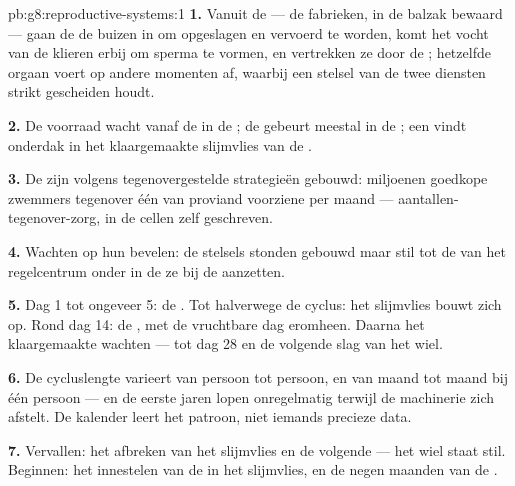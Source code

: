 \begin{solution}{pb:g8:reproductive-systems:1}
\textbf{1.} Vanuit de  --- de fabrieken, in de balzak bewaard ---
gaan de  de buizen in om opgeslagen en vervoerd te worden, komt
het vocht van de klieren erbij om sperma te vormen, en vertrekken ze door
de ; hetzelfde orgaan voert op andere momenten  af, waarbij een
stelsel van  de twee diensten strikt gescheiden houdt.

\textbf{2.} De voorraad wacht vanaf de  in de ; de
 gebeurt meestal in de ; een  vindt
onderdak in het klaargemaakte slijmvlies van de .

\textbf{3.} De  zijn volgens tegenovergestelde strategieën
gebouwd: miljoenen goedkope zwemmers tegenover één van proviand voorziene
 per maand --- aantallen-tegenover-zorg, in de cellen zelf
geschreven.

\textbf{4.} Wachten op hun bevelen: de stelsels stonden gebouwd maar stil
tot de  van het regelcentrum onder in de  ze bij de
 aanzetten.

\textbf{5.} Dag 1 tot ongeveer 5: de . Tot halverwege de
cyclus: het slijmvlies bouwt zich op. Rond dag 14: de , met de
vruchtbare dag eromheen. Daarna het klaargemaakte wachten --- tot dag 28
en de volgende slag van het wiel.

\textbf{6.} De cycluslengte varieert van persoon tot persoon, en van maand
tot maand bij één persoon --- en de eerste jaren lopen onregelmatig
terwijl de machinerie zich afstelt. De kalender leert het patroon, niet
iemands precieze data.

\textbf{7.} Vervallen: het afbreken van het slijmvlies en de volgende
 --- het wiel staat stil. Beginnen: het innestelen van de
 in het slijmvlies, en de negen maanden van de .


\end{solution}
